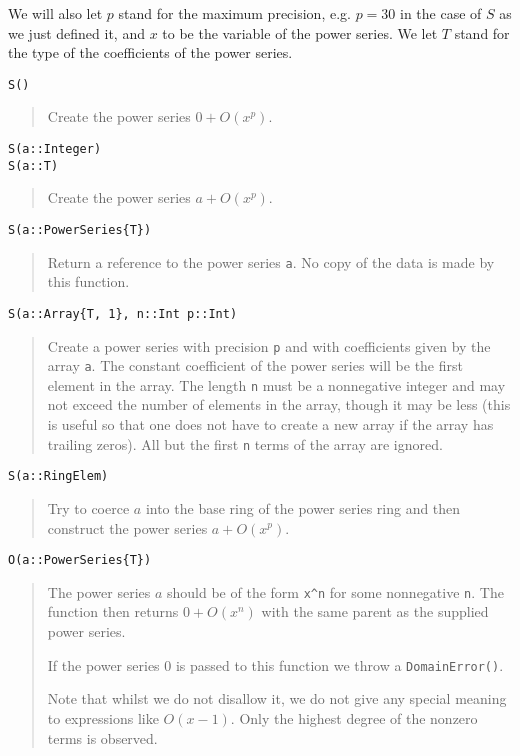 \documentclass[a4paper,10pt]{article}
\newcommand{\code}{\lstinline}
\newcommand{\desc}[1]{\vspace{-3mm}\begin{quote}#1\end{quote}}
\begin{document}
We will also let $p$ stand for the maximum precision, e.g. $p = 30$ in the case of
$S$ as we just defined it, and $x$ to be the variable of the power series. We let
$T$ stand for the type of the coefficients of the power series.

\begin{lstlisting}
S()
\end{lstlisting}

\desc{Create the power series $0 + O(x^p)$.}

\begin{lstlisting}
S(a::Integer)
S(a::T)
\end{lstlisting}

\desc{Create the power series $a + O(x^p)$.}

\begin{lstlisting}
S(a::PowerSeries{T})
\end{lstlisting}

\desc{Return a reference to the power series \code{a}. No copy of the data is
made by this function.}

\begin{lstlisting}
S(a::Array{T, 1}, n::Int p::Int)
\end{lstlisting}

\desc{Create a power series with precision \code{p} and with coefficients given
by the array \code{a}. The constant coefficient of the power series will be the
first element in the array. The length \code{n} must be a nonnegative integer
and may not exceed the number of elements in the array, though it may be less
(this is useful so that one does not have to create a new array if the array
has trailing zeros). All but the first \code{n} terms of the array are ignored.}

\begin{lstlisting}
S(a::RingElem)
\end{lstlisting}

\desc{Try to coerce $a$ into the base ring of the power series ring and then
construct the power series $a + O(x^p)$.}

\begin{lstlisting}
O(a::PowerSeries{T})
\end{lstlisting}

\desc{The power series $a$ should be of the form \code{x^n} for some nonnegative
\code{n}. The function then returns $0 + O(x^n)$ with the same parent as the
supplied power series.

If the power series $0$ is passed to this function we throw a \code{DomainError()}. 

Note that whilst we do not disallow it, we do not give any special meaning to
expressions like $O(x - 1)$. Only the highest degree of the nonzero terms is
observed.}
\end{document}
